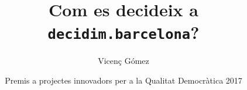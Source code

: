 \documentclass[final,10pt]{article}
\begin{document}

\title{Com es decideix a \texttt{decidim.barcelona}?}
\author{Vicen\c{c} G\'omez}

\date{Premis a projectes innovadors per a la Qualitat Democr\`atica 2017
} 
\maketitle
\end{document}
